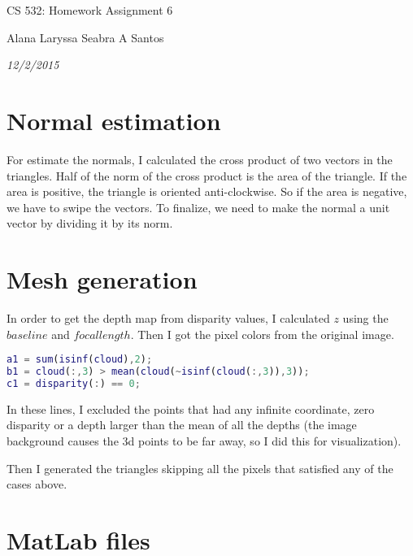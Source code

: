 \documentclass{article}
\begin{document}
\centerline{\sc \large CS 532: Homework Assignment 6}
\vspace{.3pc}
\centerline{Alana Laryssa Seabra A Santos}
\centerline{\it 12/2/2015}
\vspace{.6pc}

\section{Normal estimation}

For estimate the normals, I calculated the cross product of two vectors in the triangles. Half of the norm of the cross product is the area of the triangle. If the area is positive, the triangle is oriented anti-clockwise. So if the area is negative, we have to swipe the vectors. To finalize, we need to make the normal a unit vector by dividing it by its norm.

\section{Mesh generation}

In order to get the depth map from disparity values, I calculated $z$ using the $baseline$ and $focal length$. Then I got the pixel colors from the original image. 

\begin{lstlisting}[language=matlab]
a1 = sum(isinf(cloud),2);
b1 = cloud(:,3) > mean(cloud(~isinf(cloud(:,3)),3));
c1 = disparity(:) == 0;
\end{lstlisting}

In these lines, I excluded the points that had any infinite coordinate, zero disparity or a depth larger than the mean of all the depths (the image background causes the 3d points to be far away, so I did this for visualization).

Then I generated the triangles skipping all the pixels that satisfied any of the cases above.

\section{MatLab files}
\end{document}
